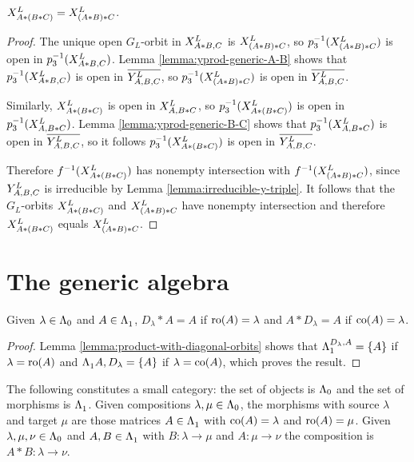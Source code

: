\documentclass[a4paper, 11pt]{report}
\begin{document}
\begin{proposition}\label{proposition:associativity}
$\xprod[L]{A\ast (B\ast C)} = \xprod[L]{(A\ast B)\ast C}$.
\end{proposition}

\begin{proof}
The unique open $G_L$-orbit in $\xprod[L]{A\ast B, C}$ is $\xprod[L]{(A\ast B)\ast C}$, so $p_3^{-1}(\xprod[L]{(A\ast B)\ast C})$ is open in $p_3^{-1}(\xprod[L]{A\ast B,C})$. Lemma \ref{lemma:yprod-generic-A-B} shows that $p_3^{-1}(\xprod[L]{A\ast B,C})$ is open in $\overline{\yprod[L]{A,B,C}}$, so $p_3^{-1}(\xprod[L]{(A\ast B)\ast C})$ is open in $\overline{\yprod[L]{A,B,C}}$.

Similarly, $\xprod[L]{A\ast (B\ast C)}$ is open in $\xprod[L]{A,B\ast C}$, so $p_3^{-1}(\xprod[L]{A\ast (B\ast C)})$ is open in $p_3^{-1}(\xprod[L]{A,B\ast C})$. Lemma \ref{lemma:yprod-generic-B-C} shows that $p_3^{-1}(\xprod[L]{A,B\ast C})$ is open in $\overline{\yprod[L]{A,B,C}}$, so it follows $p_3^{-1}(\xprod[L]{A\ast (B\ast C)})$ is open in $\overline{\yprod[L]{A,B,C}}$.

Therefore $f^{-1}(\xprod[L]{A\ast (B\ast C)})$ has nonempty intersection with $f^{-1}(\xprod[L]{(A\ast B)\ast C})$, since $\yprod[L]{A,B,C}$ is irreducible by Lemma \ref{lemma:irreducible-y-triple}. It follows that the $G_L$-orbits $\xprod[L]{A\ast (B\ast C)}$ and $\xprod[L]{(A\ast B)\ast C}$ have nonempty intersection and therefore $\xprod[L]{A\ast (B\ast C)}$ equals $\xprod[L]{(A\ast B)\ast C}$.
\end{proof}


\section{The generic algebra}

\begin{lemma}\label{lemma:identity-morphisms}
Given $\lambda\in\compositions$ and $A\in\matrices$, $D_\lambda\ast A = A$ if $\ro{A}=\lambda$ and $A\ast D_\lambda = A$ if $\co{A}=\lambda$.
\end{lemma}
\begin{proof}
Lemma \ref{lemma:product-with-diagonal-orbits} shows that $\matrices[D_\lambda,A] = \{A\}$ if $\lambda=\ro{A}$ and $\matrices{A,D_\lambda} = \{A\}$ if $\lambda=\co{A}$, which proves the result. 
\end{proof}

\begin{theorem}\label{thm:generic-category}
The following constitutes a small category: the set of objects is $\compositions$ and the set of morphisms is $\matrices$. Given compositions $\lambda,\mu\in\compositions$, the morphisms with source $\lambda$ and target $\mu$ are those matrices $A\in\matrices$ with $\co{A}=\lambda$ and $\ro{A}=\mu$. Given $\lambda,\mu,\nu\in\compositions$ and $A,B\in\matrices$ with $B\colon\lambda\to\mu$ and $A\colon\mu\to\nu$ the composition is $A\ast B\colon\lambda\to\nu$.
\end{theorem}
\end{document}
